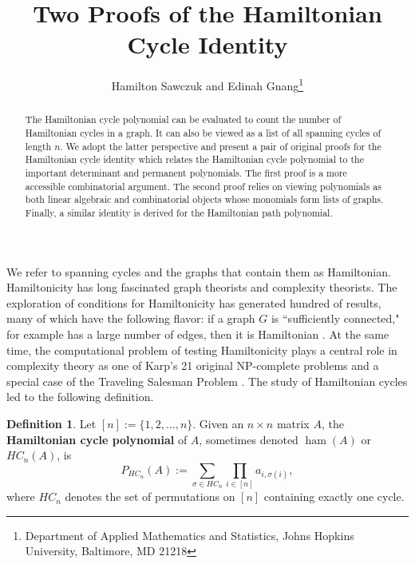 \documentclass{article}
\theoremstyle{theorem}
\theoremstyle{definition}
\newtheorem{defn}[thm]{Definition}
\begin{document}
\title{Two Proofs of the Hamiltonian Cycle Identity}
\author{Hamilton Sawczuk and Edinah Gnang\thanks{Department of Applied Mathematics and Statistics, Johns Hopkins University, Baltimore, MD 21218}}  %

\maketitle

\begin{abstract}
The Hamiltonian cycle polynomial can be evaluated to count the number of Hamiltonian cycles in a graph. It can also be viewed as a list of all spanning cycles of length $n$. We adopt the latter perspective and present a pair of original proofs for the Hamiltonian cycle identity which relates the Hamiltonian cycle polynomial to the important determinant and permanent polynomials. The first proof is a more accessible combinatorial argument. The second proof relies on viewing polynomials as both linear algebraic and combinatorial objects whose monomials form lists of graphs. Finally, a similar identity is derived for the Hamiltonian path polynomial.
\end{abstract}

We refer to spanning cycles and the graphs that contain them as Hamiltonian. Hamiltonicity has long fascinated graph theorists and complexity theorists. The exploration of conditions for Hamiltonicity has generated hundred of results, many of which have the following flavor: if a graph $G$ is ``sufficiently connected," for example has a large number of edges, then it is Hamiltonian \cite{gou91,gou03}. At the same time, the computational problem of testing Hamiltonicity plays a central role in complexity theory as one of Karp's 21 original NP-complete problems and a special case of the Traveling Salesman Problem \cite{kar72}. The study of Hamiltonian cycles led to the following definition.

\begin{defn}
    Let $[n]:=\{1,2,\hdots,n\}$. Given an $n\times n$ matrix $A$, the \textbf{Hamiltonian cycle polynomial} of $A$, sometimes denoted $\operatorname{ham}(A)$ or $HC_n(A)$, is
    \[
        P_{HC_n}(A):=\sum_{\sigma\in HC_n}\prod_{i\in[n]}a_{i,\sigma(i)},
    \]
    where $HC_n$ denotes the set of permutations on $[n]$ containing exactly one cycle.
\end{defn}
\end{document}
